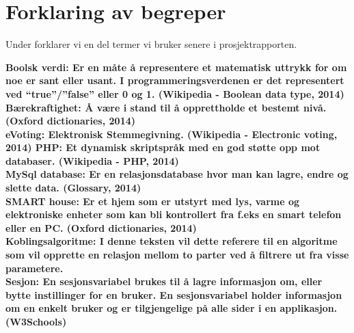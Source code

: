 \section{Forklaring av begreper}

Under forklarer vi en del termer vi bruker senere i prosjektrapporten.

\bf{Boolsk verdi:} Er en måte å representere et matematisk uttrykk for om noe er sant eller usant. I programmeringsverdenen er det representert ved “true”/”false” eller 0 og 1. (Wikipedia - Boolean data type, 2014)\\

\bf{Bærekraftighet:} Å være i stand til å opprettholde et bestemt nivå. (Oxford dictionaries, 2014)\\

\bf{eVoting:} Elektronisk Stemmegivning. (Wikipedia - Electronic voting, 2014)
PHP:  Et dynamisk skriptspråk med en god støtte opp mot databaser. (Wikipedia - PHP, 2014)\\

\bf{MySql database:} Er en relasjonsdatabase hvor man kan lagre, endre og slette data. (Glossary, 2014)\\

\bf{SMART house:} Er et hjem som er utstyrt med lys, varme og elektroniske enheter som kan bli kontrollert fra f.eks en smart telefon eller en PC. (Oxford dictionaries, 2014)\\

\bf{Koblingsalgoritme:}  I denne teksten vil dette referere til en algoritme som vil opprette en relasjon mellom to parter ved å filtrere ut fra visse parametere.\\

\bf{Sesjon:} En sesjonsvariabel brukes til å lagre informasjon om, eller bytte instillinger for en bruker. En sesjonsvariabel holder informasjon om en enkelt bruker og er tilgjengelige på alle sider i en applikasjon. (W3Schools)
